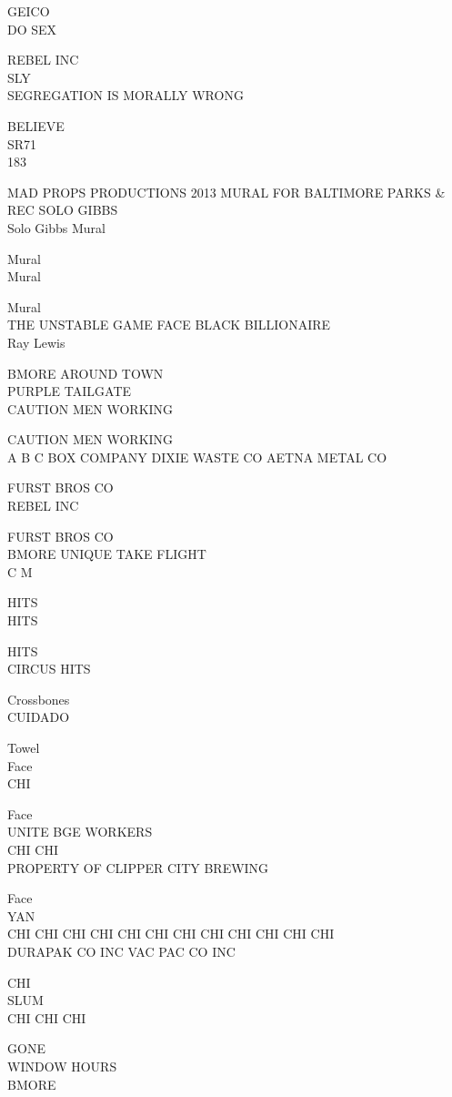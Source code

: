 \documentclass[10pt,letterpaper]{article}
\begin{document}
GEICO\\
DO SEX

REBEL INC\\
SLY\\
SEGREGATION IS MORALLY WRONG

BELIEVE\\
SR71\\
183

MAD PROPS PRODUCTIONS 2013 MURAL FOR BALTIMORE PARKS \& REC SOLO GIBBS\\
Solo Gibbs Mural

Mural\\
Mural

Mural\\
THE UNSTABLE GAME FACE BLACK BILLIONAIRE\\
Ray Lewis

BMORE AROUND TOWN\\
PURPLE TAILGATE\\
CAUTION MEN WORKING

CAUTION MEN WORKING\\
A B C BOX COMPANY DIXIE WASTE CO AETNA METAL CO

FURST BROS CO\\
REBEL INC

FURST BROS CO\\
BMORE UNIQUE TAKE FLIGHT\\
C M

HITS\\
HITS

HITS\\
CIRCUS HITS

Crossbones\\
CUIDADO

Towel\\
Face\\
CHI

Face\\
UNITE BGE WORKERS\\
CHI CHI\\
PROPERTY OF CLIPPER CITY BREWING

Face\\
YAN\\
CHI CHI CHI CHI CHI CHI CHI CHI CHI CHI CHI CHI\\
DURAPAK CO INC VAC PAC CO INC

CHI\\
SLUM\\
CHI CHI CHI

GONE\\
WINDOW HOURS\\
BMORE
\end{document}
